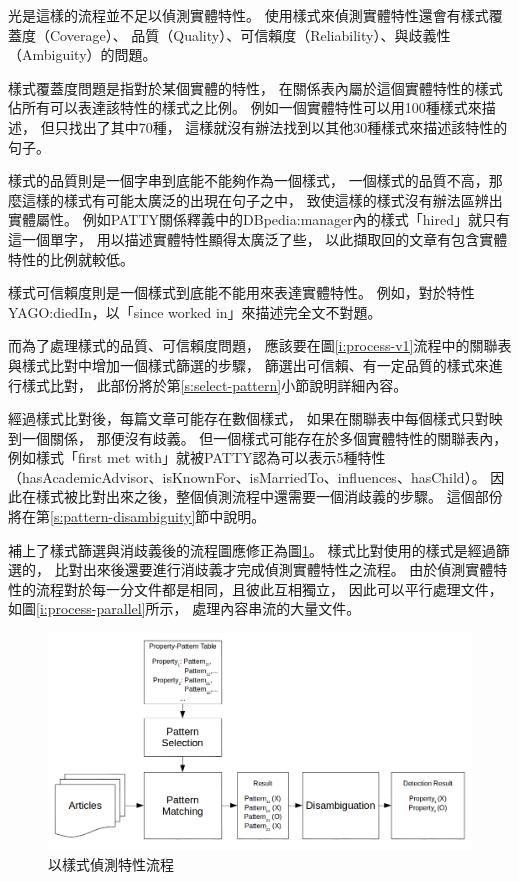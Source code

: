 

光是這樣的流程並不足以偵測實體特性。
使用樣式來偵測實體特性還會有樣式覆蓋度（Coverage）、
品質（Quality）、可信賴度（Reliability）、與歧義性（Ambiguity）的問題。

樣式覆蓋度問題是指對於某個實體的特性，
在關係表內屬於這個實體特性的樣式佔所有可以表達該特性的樣式之比例。
例如一個實體特性可以用100種樣式來描述，
但只找出了其中70種，
這樣就沒有辦法找到以其他30種樣式來描述該特性的句子。

樣式的品質則是一個字串到底能不能夠作為一個樣式，    %
一個樣式的品質不高，那麼這樣的樣式有可能太廣泛的出現在句子之中，
致使這樣的樣式沒有辦法區辨出實體屬性。
例如PATTY關係釋義中的DBpedia:manager內的樣式「hired」就只有這一個單字，
用以描述實體特性顯得太廣泛了些，
以此擷取回的文章有包含實體特性的比例就較低。

樣式可信賴度則是一個樣式到底能不能用來表達實體特性。
例如，對於特性YAGO:diedIn，以「since worked in」來描述完全文不對題。

而為了處理樣式的品質、可信賴度問題，
應該要在圖\ref{i:process-v1}流程中的關聯表與樣式比對中增加一個樣式篩選的步驟，
篩選出可信賴、有一定品質的樣式來進行樣式比對，
此部份將於第\ref{s:select-pattern}小節說明詳細內容。

經過樣式比對後，每篇文章可能存在數個樣式，
如果在關聯表中每個樣式只對映到一個關係，
那便沒有歧義。
但一個樣式可能存在於多個實體特性的關聯表內，
例如樣式「first met with」就被PATTY認為可以表示5種特性（hasAcademicAdvisor、isKnownFor、isMarriedTo、influences、hasChild）。
因此在樣式被比對出來之後，整個偵測流程中還需要一個消歧義的步驟。
這個部份將在第\ref{s:pattern-disambiguity}節中說明。

補上了樣式篩選與消歧義後的流程圖應修正為圖\ref{i:process-v2}。
樣式比對使用的樣式是經過篩選的，
比對出來後還要進行消歧義才完成偵測實體特性之流程。
由於偵測實體特性的流程對於每一分文件都是相同，且彼此互相獨立，
因此可以平行處理文件，如圖\ref{i:process-parallel}所示，
處理內容串流的大量文件。

\begin{figure}
    \centering
    \includegraphics[width=1\textwidth]{images/03-process-v2}
    \caption{以樣式偵測特性流程}
    \label{i:process-v2}
\end{figure}

